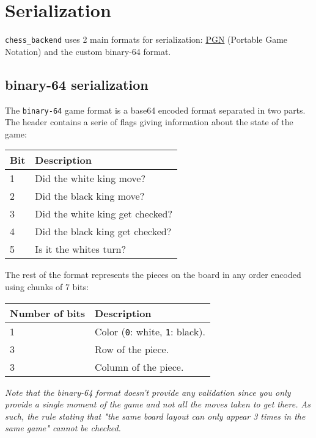 \section{Serialization}
\label{serialization}

\texttt{chess\_backend} uses 2 main formats for serialization: \href{http://www.saremba.de/chessgml/standards/pgn/pgn-complete.htm}{PGN} (Portable Game Notation) and the custom binary-64 format.

\subsection{binary-64 serialization}

The \texttt{binary-64} game format is a base64 encoded format separated in two parts.
The header contains a serie of flags giving information about the state of the game:

\begin{center}
\begin{tabu} to\linewidth {X[c, -1] | X[l, 2]}
    Bit & Description \\ \hline{} & Did the white king move? \\
    2 & Did the black king move? \\
    3 & Did the white king get checked? \\
    4 & Did the black king get checked? \\
    5 & Is it the whites turn? \\
\end{tabu}
\end{center}
%
The rest of the format represents the pieces on the board in any order encoded using chunks of 7 bits:

\begin{center}
\begin{tabu} to\linewidth {X[c, -1] | X[l, 2]}
    Number of bits & Description \\ \hline {} & Color (\texttt{0}: white, \texttt{1}: black). \\
    3 & Row of the piece. \\
    3 & Column of the piece. \\
\end{tabu}
\end{center}
%
\emph{Note that the binary-64 format doesn't provide any validation since you only provide a single moment of the game and not all the moves taken to get there. As such, the rule stating that "the same board layout can only appear 3 times in the same game" cannot be checked.}
